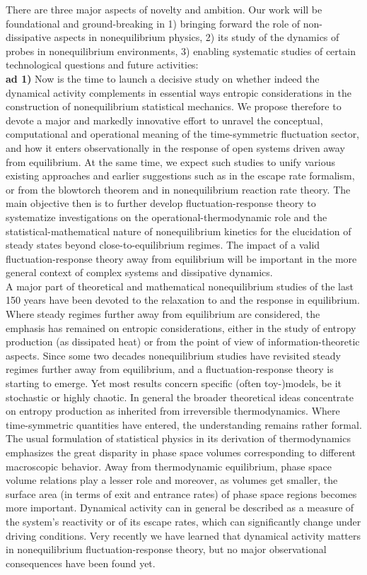 There are three major aspects of novelty and ambition.  Our work will be foundational and ground-breaking in 1) bringing forward the role of non-dissipative aspects in nonequilibrium physics, 2) its study of the dynamics of probes in nonequilibrium environments, 3) enabling systematic studies of certain technological questions and future activities:\\
{\bf ad 1)} Now is the time to launch a decisive study on whether indeed the dynamical activity complements in essential ways entropic considerations in the construction of nonequilibrium statistical  mechanics. We propose therefore to devote a major and markedly innovative effort to unravel the conceptual, computational and operational meaning of the time-symmetric fluctuation sector, and how it enters observationally in the response of open systems driven away from equilibrium. At the same time, we expect such studies to unify various existing approaches and earlier suggestions such as in the escape rate formalism, or from the blowtorch theorem and in nonequilibrium reaction rate theory. The main objective then is to further develop fluctuation-response theory to systematize investigations on the operational-thermodynamic role and the statistical-mathematical nature of nonequilibrium kinetics for the elucidation of steady states beyond close-to-equilibrium regimes. The impact of a valid fluctuation-response theory away from equilibrium will be important in the more general context of complex systems and dissipative dynamics.\\
A major part of theoretical and mathematical nonequilibrium studies of the last 150 years have been devoted to the relaxation to and the response in equilibrium. Where steady regimes further away from equilibrium are considered, the emphasis has remained on entropic considerations, either in the study of entropy production (as dissipated heat) or from the point of view of information-theoretic aspects.
Since some two decades nonequilibrium studies have revisited steady regimes further away from equilibrium, and a fluctuation-response theory is starting to emerge. Yet most results concern specific (often toy-)models, be it stochastic or highly chaotic. In general the broader theoretical ideas concentrate on entropy production as inherited from irreversible thermodynamics. Where time-symmetric quantities have entered, the understanding remains rather formal.
The usual formulation of statistical physics in its derivation of thermodynamics emphasizes the great disparity in phase space volumes corresponding to different macroscopic behavior. Away from thermodynamic equilibrium, phase space volume relations play a lesser role and moreover, as volumes get smaller, the surface area (in terms of exit and entrance rates) of phase space regions becomes more important.
Dynamical activity can in general be described as a measure of the system’s reactivity or of its escape rates, which can significantly change under driving conditions. Very recently we have learned that dynamical activity matters in nonequilibrium fluctuation-response theory, but no major observational consequences have been found yet.

